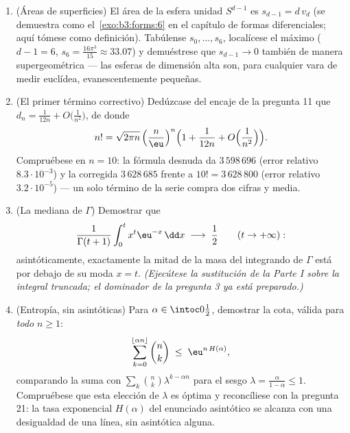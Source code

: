 \begin{problem}
\begin{enumerate}[resume]
        $\alpha =
        \frac12$ recupera la pregunta 5 y que $H(\alpha) <
        \ln2$ para $\alpha \neq \frac12$ (de modo que las binomiales
        descentradas son exponencialmente
        despreciables en $2^n$). \item (Áreas de superficies) El área de
        la esfera unidad $S^{d-1}$ es $s_{d-1} = d\,v_d$ (se demuestra
        como el~\cref{exo:b3:forms:6} en el capítulo de formas
        diferenciales; aquí tómese como definición). Tabúlense
        $s_0, \dots, s_6$, localícese el máximo ($d - 1 =
        6$, $s_6 = \frac{16\pi^3}{15} \approx 33.07$) y demuéstrese que
        $s_{d-1} \to 0$ también de manera supergeométrica --- las
        esferas de dimensión alta son, para cualquier vara de medir
        euclídea, evanescentemente pequeñas. \item (El primer término
        correctivo) Dedúzcase del encaje de la pregunta 11 que
        $d_n = \frac1{12n} +
        O\bigl(\frac1{n^2}\bigr)$, de donde
        \[
        n! = \sqrt{2\pi n}\,\Bigl(\frac
        n\eu\Bigr)^{n}\Bigl(1 + \frac1{12n} +
        O\Bigl(\frac1{n^2}\Bigr)\Bigr).
        \]
        Compruébese en $n = 10$: la fórmula desnuda da $3\,598\,696$
        (error relativo $8.3\cdot10^{-3}$) y la corregida $3\,628\,685$
        frente a $10! =
        3\,628\,800$ (error relativo $3.2\cdot10^{-5}$) --- un solo
        término de la serie compra dos cifras y media. \item (La mediana
        de $\Gamma$) Demostrar que
        \[
        \frac{1}{\Gamma(t+1)}
        \int_0^{t} x^{t}\eu^{-x}\,\dd x
        \;\longrightarrow\; \frac12
        \qquad (t \to +\infty) :
        \]
        asintóticamente, exactamente la mitad de la masa del integrando
        de $\Gamma$ está por debajo de su moda $x = t$. \emph{(Ejecútese
        la sustitución de la Parte I sobre la integral truncada; el
        dominador de la pregunta 3 ya está preparado.)} \item (Entropía,
        sin asintóticas) Para $\alpha \in
        \intoc0{\frac12}$, demostrar la cota, válida para \emph{todo}
        $n \geq 1$:
        \[
        \sum_{k=0}^{\lfloor\alpha n\rfloor}\binom nk
        \;\leq\; \eu^{n\,H(\alpha)} ,
        \]
        comparando la suma con $\sum_k\binom
        nk\lambda^{k-\alpha n}$ para el sesgo $\lambda =
        \frac{\alpha}{1-\alpha} \leq 1$. Compruébese que esta elección
        de $\lambda$ es óptima y reconcíliese con la pregunta 21: la
        tasa exponencial $H(\alpha)$ del enunciado asintótico se alcanza
        con una desigualdad de una línea, sin asintótica alguna.
\end{enumerate}
\end{problem}
